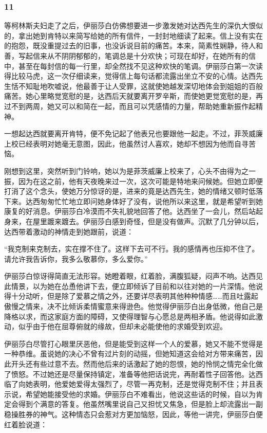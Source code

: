 \subsubsection*{11}


\par 等柯林斯夫妇走了之后，伊丽莎白仿佛想要进一步激发她对达西先生的深仇大恨似的，拿出她到肯特以来简写给她的所有信件，一封封地细读了起来。信上没有实在的抱怨，既没重提过去的旧事，也没诉说目前的痛苦。本来，简素性娴静，待人和善，写起信来从不阴阴郁郁的，笔调总是十分欢快；可现在却好，在她所有的信中，甚至在每封信的每一行里，却全然找不见这种欢快的笔调。伊丽莎白第一次读得比较马虎，这一次仔细读来，觉得信上每句话都流露出坐立不安的心情。达西先生恬不知耻地吹嘘说，他最善于让人受罪，这就使她越发深切地体会到姐姐的百般痛苦。她心里略觉宽慰的是，达西后天就要离开罗辛斯，而使她更觉宽慰的是，再过不到两周，她又可以和简在一起，而且可以凭感情的力量，帮助她重新振作起精神。
\par 一想起达西就要离开肯特，便不免记起了他表兄也要跟他一起走。不过，菲茨威廉上校已经表明对她毫无意图，因此，他虽然讨人喜欢，她却不想因为他而自寻苦恼。
\par 刚想到这里，突然听到门铃响，她以为是菲茨威廉上校来了，心头不由得为之一振，因为在这之前，他有天夜晚来过一次，这次可能是特地来问候她。但她立即便打消了这个念头，使她万分惊讶的是，进来的竟是达西先生，她的情绪又顿时低落下来。达西匆匆忙忙地立即问她身体好了没有，说他所以来这里，就是希望听到她康复的好消息。伊丽莎白冷漠而不失礼貌地回答了他。达西坐了一会儿，然后站起身来，在屋里踱来踱去。伊丽莎白感到奇怪，但是没有做声。沉默了几分钟以后，达西带着激动的神情走到她跟前，说道：
\par “我克制来克制去，实在撑不住了。这样下去可不行。我的感情再也压抑不住了。请允许我告诉你，我多么敬慕你，多么爱你。”
\par 伊丽莎白惊讶得简直无法形容。她瞪着眼，红着脸，满腹狐疑，闷声不响。达西见此情景，以为她在怂恿他讲下去，便立即倾诉了目前和以往对她的一片深情。他说得十分动听，但是除了爱慕之情之外，还要详尽表明其他种种情感……而且吐露起傲慢之情来，决不比倾诉柔情蜜意来得逊色。他觉得伊丽莎白出身低微，他自己是降格以求，而这家庭方面的障碍，又使得理智与心愿总是两相矛盾。他说得如此激动，似乎由于他在屈尊俯就的缘故，但却未必能使他的求婚受到欢迎。
\par 伊丽莎白尽管打心眼里厌恶他，但是能受到这样一个人的爱慕，她又不能不觉得是一种恭维。虽说她的决心不曾有过片刻的动摇，但她知道这会给对方带来痛苦，因此开头还有些过意不去。然而他后来的话激起了她的怨恨，她的怜悯之情完全化做了愤怒。不过她还是尽量保持镇定，准备等他把话说完，再耐着性子回答他。达西临了向她表明，他爱她爱得太强烈了，尽管一再克制，还是觉得克制不住；并且表示说，希望她能接受他的求婚。伊丽莎白不难看出，他说这些话的时候，自以为肯定会得到个满意的答复。他虽然嘴里说自己又担忧又焦急，但是脸上却流露出一副稳操胜券的神气。这种情态只会惹对方更加恼怒，因此，等他一讲完，伊丽莎白便红着脸说道：
